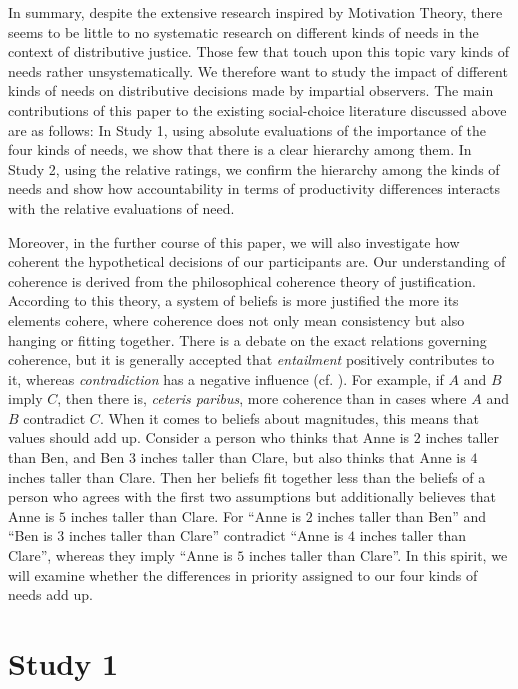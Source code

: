 \documentclass[10pt,letterpaper]{article}
\begin{document}
In summary, despite the extensive research inspired by Motivation Theory, there seems to be little to no systematic research on different kinds of needs in the context of distributive justice.
Those few that touch upon this topic vary kinds of needs rather unsystematically.
We therefore want to study the impact of different kinds of needs on distributive decisions made by impartial observers.
The main contributions of this paper to the existing social-choice literature discussed above are as follows:
In Study 1, using absolute evaluations of the importance of the four kinds of needs, we show that there is a clear hierarchy among them.
In Study 2, using the relative ratings, we confirm the hierarchy among the kinds of needs and show how accountability in terms of productivity differences interacts with the relative evaluations of need.

Moreover, in the further course of this paper, we will also investigate how coherent the hypothetical decisions of our participants are.
Our understanding of coherence is derived from the philosophical coherence theory of justification.
According to this theory, a system of beliefs is more justified the more its elements cohere, where coherence does not only mean consistency but also hanging or fitting together.
There is a debate on the exact relations governing coherence, but it is generally accepted that \textit{entailment} positively contributes to it, whereas \textit{contradiction} has a negative influence (cf. \cite{bonjour_structure_1985,lehrer_theory_1990,thagard_coherence_2000}).
For example, if $A$ and $B$ imply $C$, then there is, \textit{ceteris paribus}, more coherence than in cases where $A$ and $B$ contradict $C$.
When it comes to beliefs about magnitudes, this means that values should add up.
Consider a person who thinks that Anne is $2$ inches taller than Ben, and Ben $3$ inches taller than Clare, but also thinks that Anne is $4$ inches taller than Clare.
Then her beliefs fit together less than the beliefs of a person who agrees with the first two assumptions but additionally believes that Anne is $5$ inches taller than Clare.
For ``Anne is $2$ inches taller than Ben'' and ``Ben is $3$ inches taller than Clare'' contradict ``Anne is $4$ inches taller than Clare'', whereas they imply ``Anne is $5$ inches taller than Clare''.
In this spirit, we will examine whether the differences in priority assigned to our four kinds of needs add up.


\section*{Study 1}\label{sec:study_1}
\end{document}

